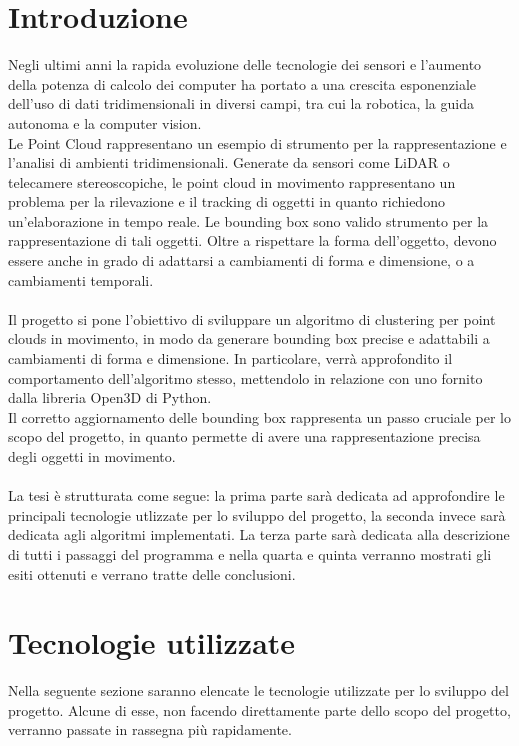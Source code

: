\documentclass[italian]{report}
\begin{document}
\chapter*{Introduzione}
Negli ultimi anni la rapida evoluzione delle tecnologie dei sensori e l'aumento della potenza di calcolo dei computer ha portato a una crescita esponenziale dell'uso di dati tridimensionali in diversi campi, tra cui la robotica, la  guida autonoma e la computer vision.\\
Le Point Cloud rappresentano un esempio di strumento per la rappresentazione e l'analisi di ambienti tridimensionali. Generate da sensori come LiDAR o telecamere stereoscopiche, le point cloud in movimento rappresentano un problema per la rilevazione e il tracking di oggetti in quanto richiedono un'elaborazione in tempo reale. Le bounding box sono valido strumento per la rappresentazione di tali oggetti. Oltre a rispettare la forma dell'oggetto, devono essere anche in grado di adattarsi a cambiamenti di forma e dimensione, o a cambiamenti temporali.\\
\\
Il progetto si pone l'obiettivo di sviluppare un algoritmo di clustering per point clouds in movimento, in modo da generare bounding box precise e adattabili a cambiamenti di forma e dimensione. In particolare, verrà approfondito il comportamento dell'algoritmo stesso, mettendolo in relazione con uno fornito dalla libreria Open3D di Python.\\
Il corretto aggiornamento delle bounding box rappresenta un passo cruciale per lo scopo del progetto, in quanto permette di avere una rappresentazione precisa degli oggetti in movimento.\\
\\
La tesi è strutturata come segue: la prima parte sarà dedicata ad approfondire le principali tecnologie utlizzate per lo sviluppo del progetto, la seconda invece sarà dedicata agli algoritmi implementati. La terza parte sarà dedicata alla descrizione di tutti i passaggi del programma e nella quarta e quinta verranno mostrati gli esiti ottenuti e verrano tratte delle conclusioni.
\newpage

\chapter{Tecnologie utilizzate}
Nella seguente sezione saranno elencate le tecnologie utilizzate per lo sviluppo del progetto. Alcune di esse, non facendo direttamente parte dello scopo del progetto, verranno passate in rassegna più rapidamente.
\end{document}
